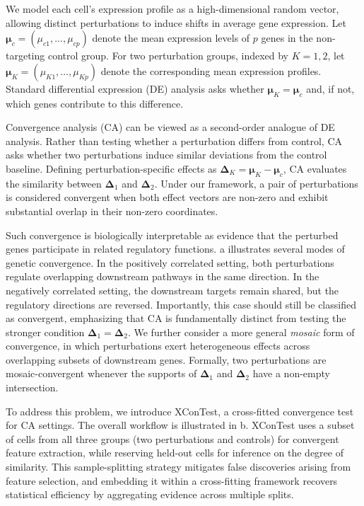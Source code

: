 \documentclass[11pt]{article}
\begin{document}
We model each cell’s expression profile as a high-dimensional random vector, allowing distinct perturbations to induce shifts in average gene expression. Let $\bm{\mu}_c = (\mu_{c1},...,\mu_{cp})$  denote the mean expression levels of $p$ genes in the non-targeting control group. For two perturbation groups, indexed by $K=1,2$, let $\bm{\mu}_K = (\mu_{K1}, \ldots, \mu_{Kp})$ denote the corresponding mean expression profiles. Standard differential expression (DE) analysis asks whether $\bm{\mu}_K = \bm{\mu}_c$ and, if not, which genes contribute to this difference.

Convergence analysis (CA) can be viewed as a second-order analogue of DE analysis. Rather than testing whether a perturbation differs from control, CA asks whether two perturbations induce similar deviations from the control baseline. Defining perturbation-specific effects as $\bm{\Delta}_K = \bm{\mu}_K - \bm{\mu}_c$, CA evaluates the similarity between $\bm{\Delta}_1$ and $\bm{\Delta}_2$. Under our framework, a pair of perturbations is considered convergent when both effect vectors are non-zero and exhibit substantial overlap in their non-zero coordinates.

Such convergence is biologically interpretable as evidence that the perturbed genes participate in related regulatory functions. a illustrates several modes of genetic convergence. In the positively correlated setting, both perturbations regulate overlapping downstream pathways in the same direction. In the negatively correlated setting, the downstream targets remain shared, but the regulatory directions are reversed. Importantly, this case should still be classified as convergent, emphasizing that CA is fundamentally distinct from testing the stronger condition $\bm{\Delta}_1 = \bm{\Delta}_2$. We further consider a more general \textit{mosaic} form of convergence, in which perturbations exert heterogeneous effects across overlapping subsets of downstream genes. Formally, two perturbations are mosaic-convergent whenever the supports of $\bm{\Delta}_1$ and $\bm{\Delta}_2$ have a non-empty intersection.

To address this problem, we introduce XConTest, a cross-fitted convergence test for CA settings. The overall workflow is illustrated in b. XConTest uses a subset of cells from all three groups (two perturbations and controls) for convergent feature extraction, while reserving held-out cells for inference on the degree of similarity. This sample-splitting strategy mitigates false discoveries arising from feature selection, and embedding it within a cross-fitting framework recovers statistical efficiency by aggregating evidence across multiple splits.
\end{document}
